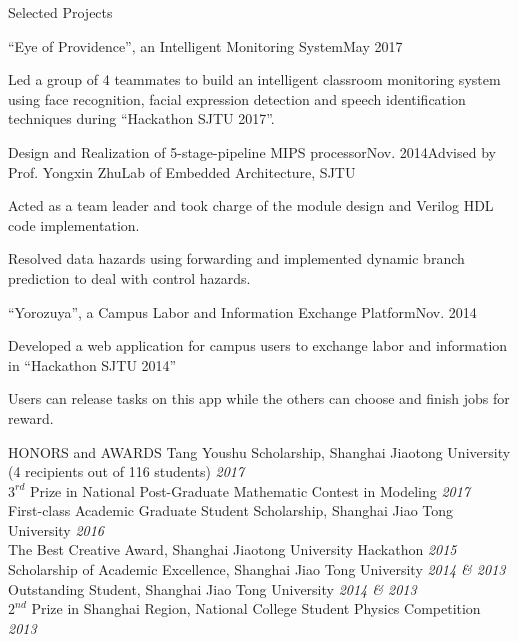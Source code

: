 \documentclass{resume_ucla} %
\begin{document}
\begin{rSection}{Selected Projects}
\begin{rSubsection}{``Eye of Providence'', an Intelligent Monitoring System}{May 2017}{}{}
\item Led a group of 4 teammates to build an intelligent classroom monitoring system using face recognition, facial expression detection and speech identification techniques during ``Hackathon SJTU 2017''.
\end{rSubsection}

\begin{rSubsection}{Design and Realization of 5-stage-pipeline MIPS processor}{Nov. 2014}{Advised by Prof. Yongxin Zhu}{Lab of Embedded Architecture, SJTU}
\item Acted as a team leader and took charge of the module design and Verilog HDL code implementation. 
\item Resolved data hazards using forwarding and implemented dynamic branch prediction to deal with control hazards.
\end{rSubsection}

\begin{rSubsection}{``Yorozuya'', a Campus Labor and Information Exchange Platform}{Nov. 2014}{}{}
\item Developed a web application for campus users to exchange labor and information in ``Hackathon SJTU 2014'' 
\item Users can release tasks on this app while the others can choose and finish jobs for reward.
\end{rSubsection}

\end{rSection}


\begin{rSection}{HONORS and AWARDS}
Tang Youshu Scholarship, Shanghai Jiaotong University (4 recipients out of 116 students) \hfill \emph{2017}
\\$3^{rd}$ Prize in National Post-Graduate Mathematic Contest in Modeling \hfill \emph{2017}
\\First-class Academic Graduate Student Scholarship, Shanghai Jiao Tong University  \hfill \emph{2016}
\\The Best Creative Award, Shanghai Jiaotong University Hackathon \hfill \emph{2015}
\\Scholarship of Academic Excellence, Shanghai Jiao Tong University \hfill \emph{2014 \& 2013}
\\Outstanding Student, Shanghai Jiao Tong University \hfill \emph{2014 \& 2013}
\\$2^{nd}$ Prize in Shanghai Region, National College Student Physics Competition \hfill \emph{2013}
\end{rSection}
\end{document}

